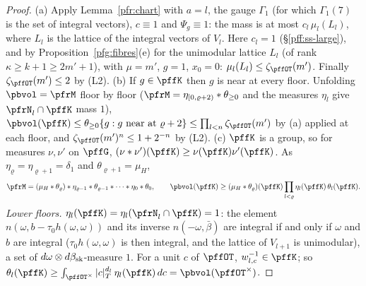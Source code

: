 \documentclass[10pt]{amsart}
\theoremstyle{definition}
\theoremstyle{remark}
\begin{document}
\begin{proof}
(a) Apply Lemma~\ref{pfr:chart} with $a=l$, the gauge $\Gamma_1$ (for which $\Gamma_1(7)$ is the set of integral
vectors), $c\equiv1$ and $\Psi_g\equiv1$: the mass is at most $c_l\,\mu_l(L_l)$, where $L_l$ is the lattice of the integral
vectors of $V_l$. Here $c_l=1$ (\S\ref{pff:ss-large}), and by Proposition~\ref{pfg:fibres}(e) for the unimodular lattice
$L_l$ (of rank $\kappa\ge k+1\ge2m'+1$), with $\mu=m'$, $g=1$, $x_0=0$: $\mu_l(L_l)\le\zeta_{\pffOT}(m')$. Finally
$\zeta_{\pffOT}(m')\le2$ by (L2).
(b) If $g\in\pffK$ then $g$ is near at every floor. Unfolding $\pbvol=\pfrM$ floor by floor
($\pfrM=\eta_{[0,\varrho+2)}\ast\theta_{\ge0}$ and the measures $\eta_l$ give $\pfrN_l\cap\pffK$ mass $1$),
$\pbvol(\pffK)\le\theta_{\ge0}\{g:g\text{ near at }\varrho+2\}\le\prod_{l<n}\zeta_{\pffOT}(m')$ by (a)
applied at each floor, and $\zeta_{\pffOT}(m')^n\le1+2^{-n}$ by (L2).
(c) $\pffK$ is a group, so for measures $\nu,\nu'$ on $\pffG$, $(\nu\ast\nu')(\pffK)\ge\nu(\pffK)\nu'(\pffK)$. As
$\eta_\varrho=\eta_{\varrho+1}=\delta_1$ and $\theta_{\varrho+1}=\mu_H$,
\[
\pfrM=(\mu_H\ast\theta_\varrho)\ast\eta_{\varrho-1}\ast\theta_{\varrho-1}\ast\dots\ast\eta_0\ast\theta_0,\qquad
\pbvol(\pffK)\ge(\mu_H\ast\theta_\varrho)(\pffK)\prod_{l<\varrho}\eta_l(\pffK)\,\theta_l(\pffK).
\]
\emph{Lower floors.} $\eta_l(\pffK)=\eta_l(\pfrN_l\cap\pffK)=1$: the element $n(\omega,b-\tau_0h(\omega,\omega))$ and its inverse
$n(-\omega,\bar\beta)$ are integral if and only if $\omega$ and $b$ are integral ($\tau_0h(\omega,\omega)$ is then integral, and the
lattice of $V_{l+1}$ is unimodular), a set of $d\omega\otimes d\beta_{\rm sk}$-measure $1$. For a unit $c$ of $\pffOT$,
$w_{l,c}^{-1}\in\pffK$; so $\theta_l(\pffK)\ge\int_{\pffOT^\times}|c|_T^{d_l}\,\eta_l(\pffK)\,dc=\pbvol(\pffOT^\times)$.


\end{proof}
\end{document}
